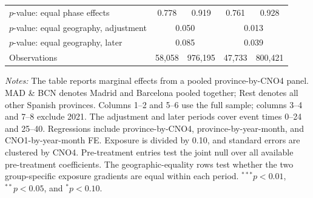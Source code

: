 \begin{table}[H]
\begin{threeparttable}
\begin{tabular}{@{}lcccc@{}}
$p$-value: equal phase effects & 0.778 & 0.919 & 0.761 & 0.928 \\
$p$-value: equal geography, adjustment & \multicolumn{2}{c}{0.050} & \multicolumn{2}{c}{0.013} \\
$p$-value: equal geography, later & \multicolumn{2}{c}{0.085} & \multicolumn{2}{c}{0.039} \\
Observations & 58,058 & 976,195 & 47,733 & 800,421 \\
\bottomrule
\end{tabular}
\begin{tablenotes}[flushleft]
\footnotesize
\item \emph{Notes:} The table reports marginal effects from a pooled province-by-CNO4 panel. MAD \& BCN denotes Madrid and Barcelona pooled together; Rest denotes all other Spanish provinces. Columns 1--2 and 5--6 use the full sample; columns 3--4 and 7--8 exclude 2021. The adjustment and later periods cover event times 0--24 and 25--40. Regressions include province-by-CNO4, province-by-year-month, and CNO1-by-year-month FE. Exposure is divided by 0.10, and standard errors are clustered by CNO4. Pre-treatment entries test the joint null over all available pre-treatment coefficients. The geographic-equality rows test whether the two group-specific exposure gradients are equal within each period. $^{***}p<0.01$, $^{**}p<0.05$, and $^{*}p<0.10$.
\end{tablenotes}
\end{threeparttable}
\end{table}
